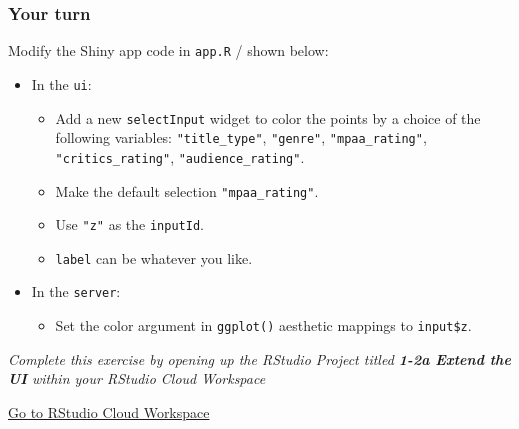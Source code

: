 \documentclass[
  letterpaper,
  DIV=11,
  numbers=noendperiod]{scrreprt}
\providecommand{\tightlist}{%
  \setlength{\itemsep}{0pt}\setlength{\parskip}{0pt}}
\begin{document}
\hypertarget{your-turn-4}{%
\subsubsection{Your turn}\label{your-turn-4}}

Modify the Shiny app code in \texttt{app.R} / shown below:

\begin{itemize}
\tightlist
\item
  In the \texttt{ui}:

  \begin{itemize}
  \tightlist
  \item
    Add a new \texttt{selectInput} widget to color the points by a
    choice of the following variables: \texttt{"title\_type"},
    \texttt{"genre"}, \texttt{"mpaa\_rating"},
    \texttt{"critics\_rating"}, \texttt{"audience\_rating"}.
  \item
    Make the default selection \texttt{"mpaa\_rating"}.
  \item
    Use \texttt{"z"} as the \texttt{inputId}.
  \item
    \texttt{label} can be whatever you like.
  \end{itemize}
\item
  In the \texttt{server}:

  \begin{itemize}
  \tightlist
  \item
    Set the color argument in \texttt{ggplot()} aesthetic mappings to
    \texttt{input\$z}.
  \end{itemize}
\end{itemize}

\emph{Complete this exercise by opening up the RStudio Project titled
\textbf{1-2a Extend the UI} within your RStudio Cloud Workspace}

\href{https://rstudio.cloud/spaces/81721/join?access_code=I4VJaNsKfTqR3Td9hLP7E1nz8\%2FtMg6Xbw9Bgqumv}{
Go to RStudio Cloud Workspace}
\end{document}
